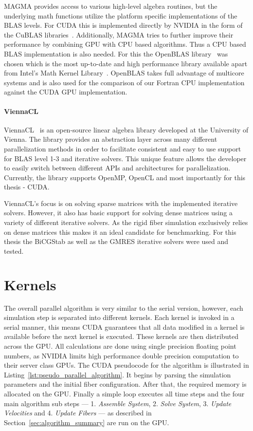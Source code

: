 MAGMA provides access to various high-level algebra routines, but the underlying math functions utilize the platform specific implementations of the BLAS levels. For CUDA this is implemented directly by NVIDIA in the form of the CuBLAS libraries~\cite{CuBLAS}. Additionally, MAGMA tries to further improve their performance by combining GPU with CPU based algorithms. Thus a CPU based BLAS implementation is also needed. For this the OpenBLAS library~\cite{OpenBLAS} was chosen which is the most up-to-date and high performance library available apart from Intel's Math Kernel Library~\cite{IntelMKL}. OpenBLAS takes full advantage of multicore systems and is also used for the comparison of our Fortran CPU implementation against the CUDA GPU implementation.

\paragraph{ViennaCL}
ViennaCL~\cite{ViennaCLDocumentation} is an open-source linear algebra library developed at the University of Vienna. The library provides an abstraction layer across many different parallelization methods in order to facilitate consistent and easy to use support for BLAS level 1-3 and iterative solvers. This unique feature allows the developer to easily switch between different APIs and architectures for parallelization. Currently, the library supports OpenMP, OpenCL and most importantly for this thesis - CUDA.

ViennaCL's focus is on solving sparse matrices with the implemented iterative solvers. However, it also has basic support for solving dense matrices using a variety of different iterative solvers. As the rigid fiber simulation exclusively relies on dense matrices this makes it an ideal candidate for benchmarking. For this thesis the BiCGStab as well as the GMRES iterative solvers were used and tested.

\section{Kernels}
\label{sec:kernels}

The overall parallel algorithm is very similar to the serial version, however, each simulation step is separated into different kernels. Each kernel is invoked in a serial manner, this means CUDA guarantees that all data modified in a kernel is available before the next kernel is executed. These kernels are then distributed across the GPU. All calculations are done using single precision floating point numbers, as NVIDIA limits high performance double precision computation to their server class GPUs. The CUDA pseudocode for the algorithm is illustrated in Listing~\ref{lst:pseudo_parallel_algorithm}. It begins by parsing the simulation parameters and the initial fiber configuration. After that, the required memory is allocated on the GPU. Finally a simple loop executes all time steps and the four main algorithm sub steps — 1. \emph{Assemble System}, 2. \emph{Solve System}, 3. \emph{Update Velocities} and 4. \emph{Update Fibers} — as described in Section~\ref{sec:algorithm_summary} are run on the GPU.

